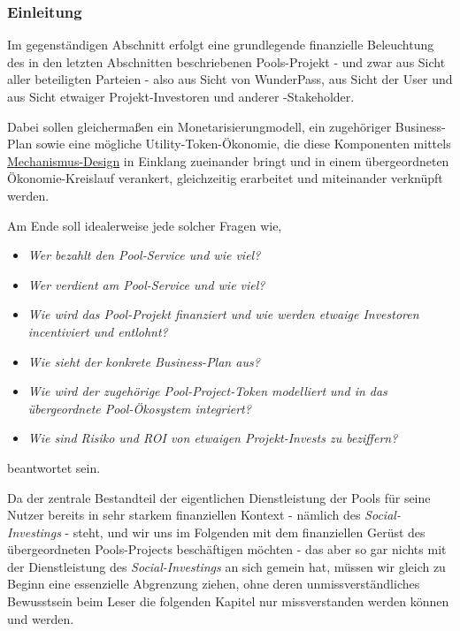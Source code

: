 
\subsubsection{Einleitung}

\vspace{0.2cm}

Im gegenständigen Abschnitt erfolgt eine grundlegende finanzielle Beleuchtung des in den letzten Abschnitten beschriebenen Pools-Projekt - und zwar aus Sicht aller beteiligten Parteien - also aus Sicht von WunderPass, aus Sicht der User und aus Sicht etwaiger Projekt-Investoren und anderer -Stakeholder.

\vspace{0.1cm}

Dabei sollen gleichermaßen ein Monetarisierungmodell, ein zugehöriger Business-Plan sowie eine mögliche Utility-Token-Ökonomie, die diese Komponenten mittels \href{https://de.wikipedia.org/wiki/Mechanismus-Design-Theorie}{Mechanismus-Design} in Einklang zueinander bringt und in einem übergeordneten Ökonomie-Kreislauf verankert, gleichzeitig erarbeitet und miteinander verknüpft werden.

\vspace{0.2cm}

Am Ende soll idealerweise jede solcher Fragen wie,

\begin{itemize}
	\item \textit{Wer bezahlt den Pool-Service und wie viel?}
	\item \textit{Wer verdient am Pool-Service und wie viel?}
	\item \textit{Wie wird das Pool-Projekt finanziert und wie werden etwaige Investoren incentiviert und entlohnt?}
	\item \textit{Wie sieht der konkrete Business-Plan aus?}
	\item \textit{Wie wird der zugehörige Pool-Project-Token modelliert und in das übergeordnete Pool-Ökosystem integriert?}
	\item \textit{Wie sind Risiko und ROI von etwaigen Projekt-Invests zu beziffern?}
\end{itemize}

beantwortet sein.

\vspace{0.5cm}

Da der zentrale Bestandteil der eigentlichen Dienstleistung der Pools für seine Nutzer bereits in sehr starkem finanziellen Kontext - nämlich des \textit{Social-Investings} - steht, und wir uns im Folgenden mit dem finanziellen Gerüst des übergeordneten Pools-Projects beschäftigen möchten - das aber so gar nichts mit der Dienstleistung des \textit{Social-Investings} an sich gemein hat, müssen wir gleich zu Beginn eine essenzielle Abgrenzung ziehen, ohne deren unmissverständliches Bewusstsein beim Leser die folgenden Kapitel nur missverstanden werden können und werden.


